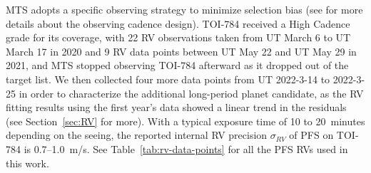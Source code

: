 \documentclass[twocolumn]{aastex631}
\begin{document}
MTS adopts a specific observing strategy to minimize selection bias (see \citealt{Teske2021} for more details about the observing cadence design). TOI-784 received a High Cadence grade for its coverage, with 22 RV observations taken from UT March 6 to UT March 17 in 2020 and 9 RV data points between UT May 22 and UT May 29 in 2021, and MTS stopped observing TOI-784 afterward as it dropped out of the target list. We then collected four more data points from UT 2022-3-14 to 2022-3-25 in order to characterize the additional long-period planet candidate, as the RV fitting results using the first year's data showed a linear trend in the residuals (see Section~\ref{sec:RV} for more). 
With a typical exposure time of 10 to 20~minutes depending on the seeing, the reported internal RV precision $\sigma_{RV}$ of PFS on TOI-784 is 0.7--1.0~m/s. See Table~\ref{tab:rv-data-points} for all the PFS RVs used in this work.
\end{document}
